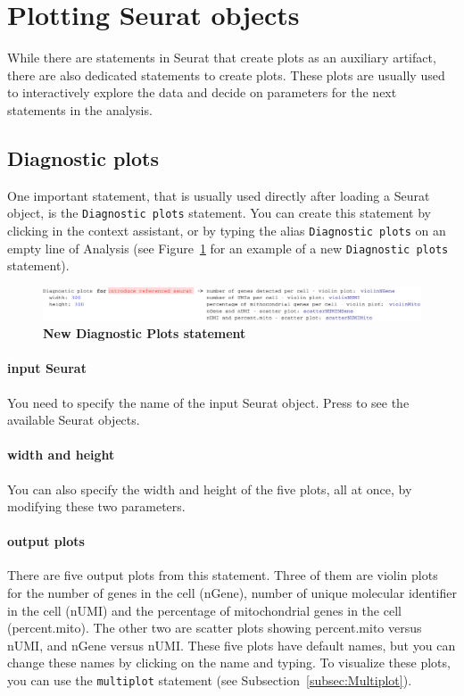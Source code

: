 \section{Plotting Seurat objects}
While there are statements in Seurat that create plots as an auxiliary artifact,
there are also dedicated statements to create plots. These plots are
usually used to interactively explore the data and decide on parameters for the next
statements in the analysis.

\subsection{Diagnostic plots}\label{subsec:DiagnosticPlots}
One important statement, that is usually used directly after loading a Seurat object, is the
\texttt{Diagnostic plots} statement. You can create this statement by clicking
 in the context assistant, or by typing
the alias \texttt{Diagnostic plots} on an empty line of Analysis (see Figure~\ref{fig:DiagnosticPlots}
for an example of a new \texttt{Diagnostic plots} statement).

\begin{figure}[h!tbp]
  \centering
  \includegraphics[width=\figWidthWide]{figures/DiagnosticPlots.pdf}
    \caption[New Diagnostic Plots statement.]{\textbf{New Diagnostic Plots statement}}
\label{fig:DiagnosticPlots}
\end{figure}

\paragraph{input Seurat} You need to specify the name of the input Seurat object. Press
\keys{\ctrl+\space} to see the available Seurat objects.

\paragraph{width and height} You can also specify the width and height of the five plots,
all at once, by modifying these two parameters.

\paragraph{output plots} There are five output plots from this statement. Three of them
are violin plots for the number of genes in the cell (nGene), number of unique molecular identifier
in the cell (nUMI) and the percentage of mitochondrial genes in the cell (percent.mito). The other two are
scatter plots showing percent.mito versus nUMI, and nGene versus nUMI. These five plots
have default names, but you can change these names by clicking on the name and typing. To
visualize these plots, you can use the \texttt{multiplot} statement (see Subsection~\ref{subsec:Multiplot}).

